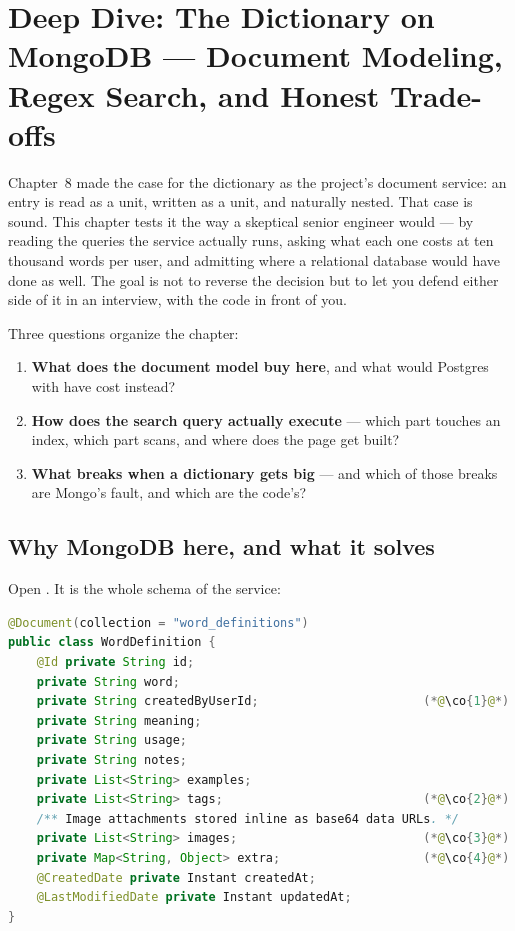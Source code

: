 \chapter{Deep Dive: The Dictionary on MongoDB --- Document Modeling, Regex Search, and Honest Trade-offs}
\label{ch:dd-mongo}

Chapter~8 made the case for the dictionary as the project's document
service: an entry is read as a unit, written as a unit, and naturally
nested. That case is sound. This chapter tests it the way a skeptical
senior engineer would --- by reading the queries the service actually
runs, asking what each one costs at ten thousand words per user, and
admitting where a relational database would have done as well. The goal
is not to reverse the decision but to let you defend either side of it
in an interview, with the code in front of you.

Three questions organize the chapter:

\begin{enumerate}
  \item \textbf{What does the document model buy here}, and what would
  Postgres with  have cost instead?
  \item \textbf{How does the search query actually execute} --- which
  part touches an index, which part scans, and where does the page get
  built?
  \item \textbf{What breaks when a dictionary gets big} --- and which of
  those breaks are Mongo's fault, and which are the code's?
\end{enumerate}

\section{Why MongoDB here, and what it solves}

Open . It is the whole schema of the service:

\begin{lstlisting}[language=Java]
@Document(collection = "word_definitions")
public class WordDefinition {
    @Id private String id;
    private String word;
    private String createdByUserId;                       (*@\co{1}@*)
    private String meaning;
    private String usage;
    private String notes;
    private List<String> examples;
    private List<String> tags;                            (*@\co{2}@*)
    /** Image attachments stored inline as base64 data URLs. */
    private List<String> images;                          (*@\co{3}@*)
    private Map<String, Object> extra;                    (*@\co{4}@*)
    @CreatedDate private Instant createdAt;
    @LastModifiedDate private Instant updatedAt;
}
\end{lstlisting}


